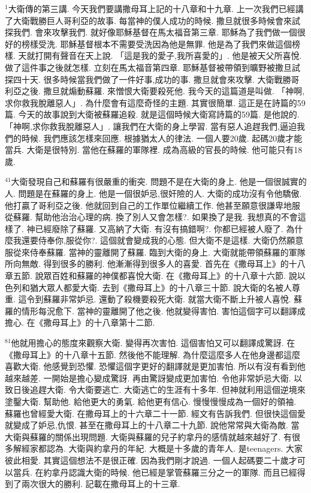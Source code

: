 \documentclass{book}
\begin{document}
$^{1}$大衛傳的第三講.
今天我們要講撒母耳上記的十八章和十九章.
上一次我們已經講了大衛戰勝巨人哥利亞的故事.
每當神的僕人成功的時候.
撒旦就很多時候會來試探我們.
會來攻擊我們.
就好像耶穌基督在馬太福音第三章.
耶穌為了我們做一個很好的榜樣受洗.
耶穌基督根本不需要受洗因為他是無罪.
他是為了我們來做這個榜樣.
天就打開有聲音在天上說.
「這是我的愛子,我所喜愛的」.
他是被天父所喜悅.
做了這件事之後就怎樣.
立刻在馬太福音第四章.
耶穌基督被帶領到曠野被撒旦試探四十天.
很多時候當我們做了一件好事,成功的事.
撒旦就會來攻擊.
大衛戰勝哥利亞之後.
撒旦就煽動蘇羅.
來憎恨大衛要殺死他.
我今天的這篇道是叫做.
「神啊,求你救我脫離惡人」.
為什麼會有這麼奇怪的主題.
其實很簡單.
這正是在詩篇的59篇.
今天的故事說到大衛被蘇羅追殺.
就是這個時候大衛寫詩篇的59篇.
是他說的.
「神啊,求你救我脫離惡人」.
讓我們在大衛的身上學習.
當有惡人追趕我們,逼迫我們的時候.
我們應該怎樣來回應.
根據猶太人的律法.
一個人要20歲.
起碼20歲才能當兵.
大衛是很特別.
當他在蘇羅的軍隊裡.
成為高級的官長的時候.
他可能只有18歲.

$^{41}$大衛發現自己和蘇羅有很嚴重的衝突.
問題不是在大衛的身上.
他是一個很誠實的人.
問題是在蘇羅的身上.
他是一個很妒忌,很奸險的人.
大衛的成功沒有令他驕傲.
他打贏了哥利亞之後.
他就回到自己的工作單位繼續工作.
他甚至願意很謙卑地服從蘇羅.
幫助他治治心理的病.
換了別人又會怎樣?.
如果換了是我.
我想真的不會這樣了.
神已經廢除了蘇羅.
又高納了大衛.
有沒有搞錯啊?.
你都已經被人廢了.
為什麼我還要侍奉你,服從你?.
這個就會變成我的心態.
但大衛不是這樣.
大衛仍然願意服從來侍奉蘇羅.
當神的靈離開了蘇羅.
臨到大衛的身上.
大衛就能帶領蘇羅的軍隊所向無敵.
得到很多的勝利.
他漸漸得到很多人的喜愛.
首先在《撒母耳上》的十八章五節.
說眾百姓和蘇羅的神僕都喜悅大衛.
在《撒母耳上》的十八章十六節.
說以色列和猶大眾人都愛大衛.
去到《撒母耳上》的十八章三十節.
說大衛的名被人尊重.
這令到蘇羅非常妒忌.
還動了殺機要殺死大衛.
就當大衛不斷上升被人喜悅.
蘇羅的情形每況愈下.
當神的靈離開了他之後.
他就變得害怕.
害怕這個字可以翻譯成擔心.
在《撒母耳上》的十八章第十二節.

$^{81}$他就用擔心的態度來觀察大衛.
變得再次害怕.
這個害怕又可以翻譯成驚訝.
在《撒母耳上》的十八章十五節.
然後他不能理解.
為什麼這麼多人在他身邊都這麼喜歡大衛.
他感覺到恐懼.
恐懼這個字更好的翻譯就是更加害怕.
所以有沒有看到他越來越差.
一開始是擔心變成驚訝.
再由驚訝變成更加害怕.
令他非常妒忌大衛.
以致日後追趕大衛.
令大衛要逃亡.
大衛逃亡的生涯有十多年.
但神就利用這個逆境來塗鑿大衛.
幫助他.
給他更大的勇氣.
給他更有信心.
慢慢慢慢成為一個好的領袖.
蘇羅也曾經愛大衛.
在撒母耳上的十六章二十一節.
經文有告訴我們.
但很快這個愛就變成了妒忌,仇恨.
甚至在撒母耳上的十八章二十九節.
說他常常與大衛為敵.
當大衛與蘇羅的關係出現問題.
大衛與蘇羅的兒子約拿丹的感情就越來越好了.
有很多解經家都認為.
大衛與約拿丹的年紀.
大概是十多歲的青年人.
是teenagers.
大家彼此相愛.
其實這個想法不是很正確.
因為我們剛才說過.
一個人起碼要二十歲才可以當兵.
在約拿丹認識大衛的時候.
他已經是掌管蘇羅三分之一的軍隊.
而且已經得到了兩次很大的勝利.
記載在撒母耳上的十三章.
\end{document}
